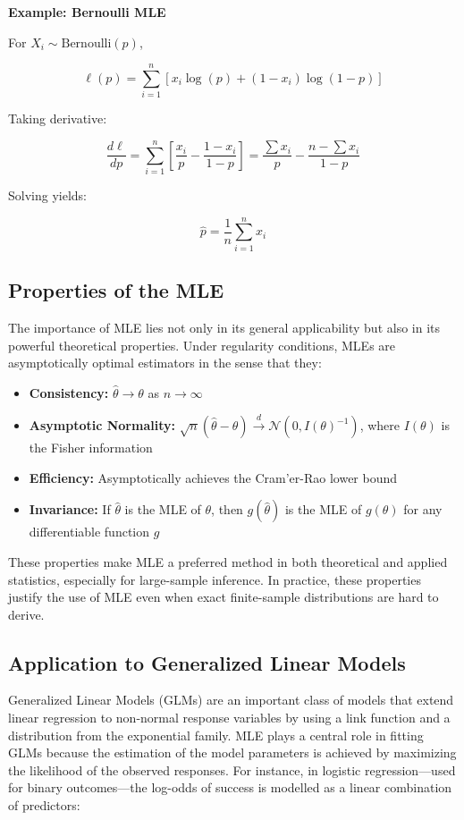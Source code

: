 \documentclass{book}
\begin{document}
\textbf{Example: Bernoulli MLE}

For $X_i \sim \text{Bernoulli}(p)$,

\[
\ell(p) = \sum_{i=1}^{n} \left[x_i \log(p) + (1 - x_i)\log(1 - p)\right]
\]

Taking derivative:

\[
\frac{d\ell}{dp} = \sum_{i=1}^{n} \left[\frac{x_i}{p} - \frac{1 - x_i}{1 - p}\right] = \frac{\sum x_i}{p} - \frac{n - \sum x_i}{1 - p}
\]

Solving yields:

\[
\hat{p} = \frac{1}{n} \sum_{i=1}^{n} x_i
\]

\subsection{Properties of the MLE}

The importance of MLE lies not only in its general applicability but also in its powerful theoretical properties. 
Under regularity conditions, MLEs are asymptotically optimal estimators in the sense that they:
\begin{itemize}
\item \textbf{Consistency:} $\hat{\theta} \to \theta$ as $n \to \infty$
\item \textbf{Asymptotic Normality:} $\sqrt{n}(\hat{\theta} - \theta) \xrightarrow{d} \mathcal{N}(0, I(\theta)^{-1})$, where $I(\theta)$ is the Fisher information
\item \textbf{Efficiency:} Asymptotically achieves the Cram'er-Rao lower bound
\item \textbf{Invariance:} If $\hat{\theta}$ is the MLE of $\theta$, then $g(\hat{\theta})$ is the MLE of $g(\theta)$ for any differentiable function $g$
\end{itemize}
These properties make MLE a preferred method in both theoretical and applied statistics, especially for large-sample inference. 
In practice, these properties justify the use of MLE even when exact finite-sample distributions are hard to derive.

\subsection{Application to Generalized Linear Models}

Generalized Linear Models (GLMs) are an important class of models that extend linear regression to non-normal response variables by using a link function and a distribution from the exponential family. MLE plays a central role in fitting GLMs because the estimation of the model parameters is achieved by maximizing the likelihood of the observed responses.
For instance, in logistic regression---used for binary outcomes---the log-odds of success is modelled as a linear combination of predictors:\\
\end{document}
